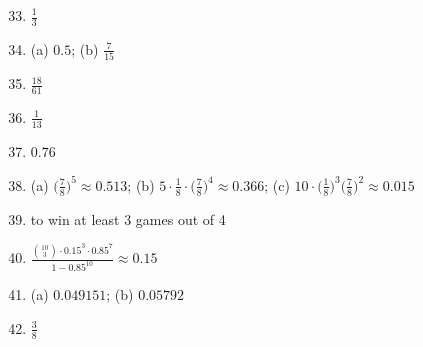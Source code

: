 \documentclass[14pt]{exam}
\begin{document}
\begin{enumerate}
 		\setcounter{enumi}{32}
 		
 		\item $\frac{1}{3}$
 		\item (a) $0.5$; (b) $\frac{7}{15}$
 		\item $\frac{18}{61}$
 		\item $\frac{1}{13}$
 		\item $0.76$
 		\item (a) $ \bigr(\frac{7}{8}\bigr)^5 \approx 0.513$; (b) $5 \cdot \frac{1}{8}\cdot \bigr(\frac{7}{8}\bigr)^4\approx 0.366$; (c) $10 \cdot \bigr(\frac{1}{8}\bigr)^3 \bigr(\frac{7}{8}\bigr)^2\approx 0.015$
 		\item to win at least 3 games out of 4
 		\item $\frac{\binom{10}{3}\cdot 0.15^{3}  \cdot 0.85^{7}}{1 - 0.85 ^{10}} \approx 0.15$
 		\item (a) $0.049151$; (b) $0.05792$
 		\item $\frac{3}{8}$
 	\end{enumerate}
\end{document}
